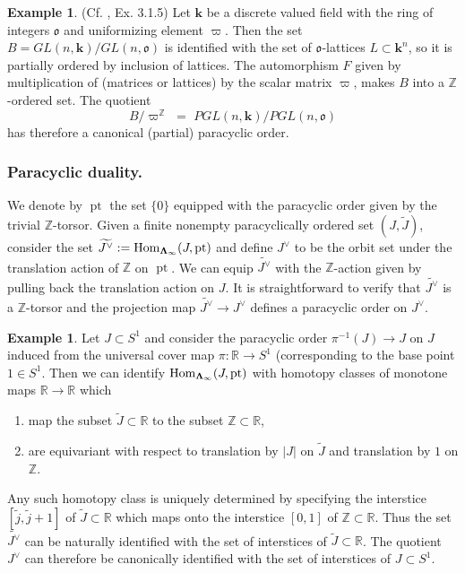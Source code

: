 \documentclass[english,11pt,leqno]{article}
\def\RR{\mathbb{R}}
\def\ZZ{\mathbb{Z}}
\def\Hom{\operatorname{Hom}}
\def\pt{\operatorname{pt}\nolimits}
\def\k{\mathbf{k}}
\def\Hom{\operatorname{Hom}}
\theoremstyle{definition}
\newtheorem{exa}[thm]{Example}
\theoremstyle{remark}
\numberwithin{equation}{section}
\begin{document}
 \begin{exa} (Cf. \cite{HSS1}, Ex. 3.1.5) Let $\k$ be a discrete valued field with the ring of integers
 $\mathfrak o$ and uniformizing element $\varpi$. Then the set $B=GL(n, \k)/GL(n, \mathfrak{o})$
 is identified with the set of $\mathfrak o$-lattices $L\subset \k^n$, so it is partially ordered
 by inclusion of lattices. The automorphism $F$ given by multiplication of (matrices or lattices)
 by the scalar matrix $\varpi$, makes $B$ into a $\ZZ$-ordered set. The quotient
 \[
 B/\varpi^\ZZ \,\,=\,\, PGL(n, \k)/PGL(n, \mathfrak{o})
 \]
 has therefore a canonical (partial) paracyclic order. 
  \end{exa}


\subsubsection{Paracyclic duality.}

We denote by $\pt$ the set $\{0\}$ equipped with the paracyclic order given by the trivial
$\ZZ$-torsor. Given a finite nonempty paracyclically ordered set $(J, \widetilde{J})$, 
consider the set $\widetilde{J^{\vee}} := \Hom_{\bf \Lambda_{\infty}}(J, \pt)$ and define $J^{\vee}$
to be the orbit set under the translation action of $\ZZ$ on $\pt$. We can equip
$\widetilde{J^{\vee}}$ with the $\ZZ$-action given by pulling back the translation action on $J$. 
It is straightforward to verify that $\widetilde{J^{\vee}}$ is a $\ZZ$-torsor and the projection map
$\widetilde{J^{\vee}} \to J^{\vee}$ defines a paracyclic order on $J^{\vee}$.

\begin{exa}
	Let $J \subset S^1$ and consider the paracyclic order $\pi^{-1}(J) \to J$ on $J$ induced from the universal
	cover map $\pi: \RR \to S^1$ (corresponding to the base point $1\in S^1$.
	 Then we can identify $\Hom_{\bf \Lambda_{\infty}}(J, \pt)$
	with homotopy classes of monotone maps $\RR \to \RR$ which 
	\begin{enumerate}
		\item map the subset $\widetilde{J} \subset \RR$ to the subset $\ZZ \subset \RR$, 
		\item are equivariant with respect to translation by $|J|$ on $\widetilde{J}$ and
			translation by $1$ on $\ZZ$.
	\end{enumerate}
	Any such homotopy class is uniquely determined by specifying the interstice
	$[\widetilde{j},\widetilde{j}+1]$ of $\widetilde{J} \subset \RR$ which maps
	onto the interstice $[0,1]$ of $\ZZ \subset \RR$. Thus the set $\widetilde{J^{\vee}}$ can
	be naturally identified with the set of interstices of $\widetilde{J} \subset \RR$. The
	quotient $J^{\vee}$ can therefore be canonically identified with the set of interstices of $J \subset
	S^1$.
\end{exa}
\end{document}
